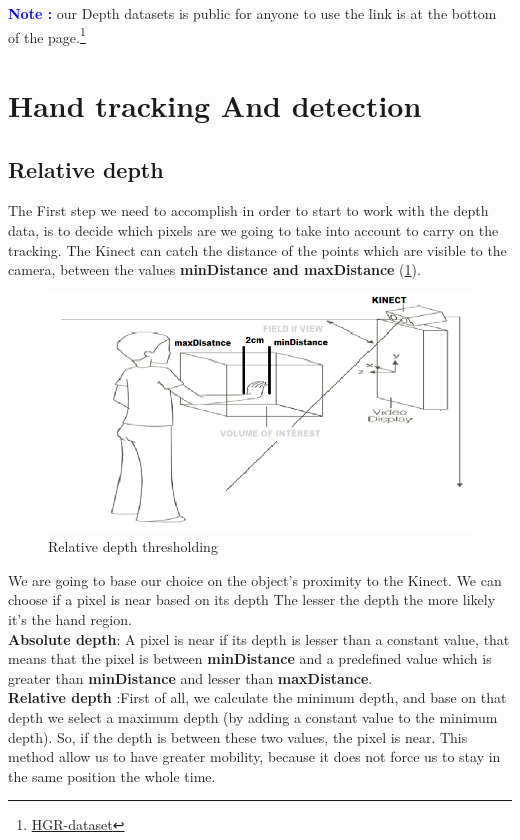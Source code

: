 \textcolor{blue}{ \textbf{Note :}} our Depth datasets is public for anyone to use  the link is at the bottom of the page.\footnote{\href{https://drive.google.com/file/d/0B89YnIYeclpadHF5ajVQVUJTTjg/view}{HGR-dataset}}



\section{Hand tracking And  detection}

\subsection{Relative depth }
The First step we need to accomplish in order to start to work with the depth data, is to decide which pixels are we going to take into account to carry on the tracking. The Kinect can catch the distance of the points which are visible to the camera, between the values \textbf{minDistance and maxDistance} (\ref{fig:cam8}).

\begin{figure}[H]
\centering
\includegraphics[width=1.0\textwidth]{img/mindistance.png}
\caption{Relative depth thresholding }
\label{fig:cam8}
\end{figure}

We are going to base our choice on the object’s proximity to the Kinect. We can choose if a pixel is near based on its depth  The lesser the depth the more likely it’s the hand region.\\\textbf{ Absolute depth}: A pixel is near if its depth is lesser than a constant value, that means that the pixel is between \textbf{minDistance }and a predefined value which is greater than \textbf{minDistance }and lesser than \textbf{maxDistance}.\\\textbf{Relative depth }:First of all,  we calculate the minimum depth, and  base on that depth we select a maximum depth (by adding a constant value to the minimum depth). So, if the depth is between these two values, the pixel is near. This method allow us to have greater mobility, because it does not force us to stay in the same position the whole time. 

